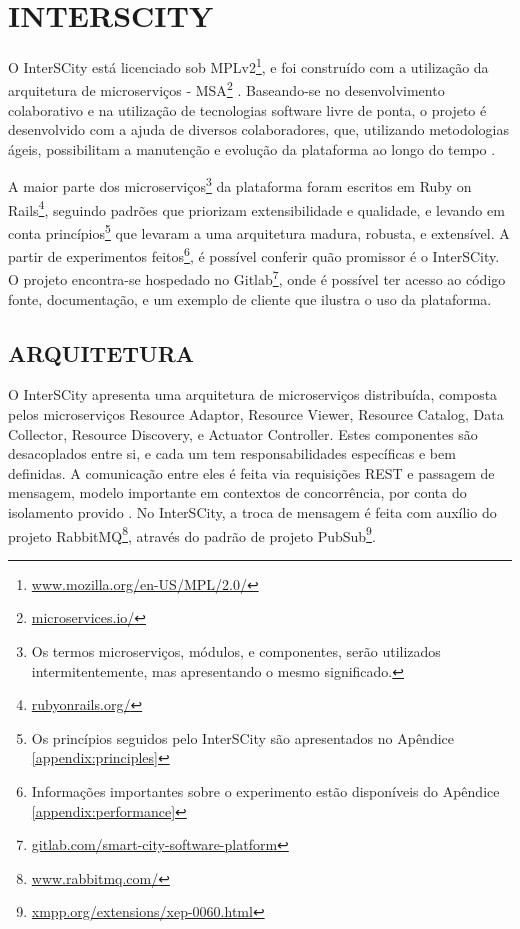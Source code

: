 \chapter[INTERSCITY]{INTERSCITY}
\label{chapter:interscity}

O InterSCity está licenciado sob MPLv2\footnote{\url{www.mozilla.org/en-US/MPL/2.0/}},
e foi construído com a utilização da arquitetura de microserviços -
MSA\footnote{\url{microservices.io/}}
\cite{delesposte2017}. Baseando-se no desenvolvimento colaborativo e na
utilização de tecnologias software livre de ponta, o projeto é desenvolvido
com a ajuda de diversos colaboradores, que, utilizando metodologias ágeis,
possibilitam a manutenção e evolução da plataforma ao longo do tempo \cite{delesposte2017}.

A maior parte dos microserviços\footnote{Os termos microserviços, módulos, e
componentes, serão utilizados intermitentemente, mas apresentando o mesmo
significado.} da plataforma foram escritos em Ruby on Rails\footnote{\url{rubyonrails.org/}},
seguindo padrões que priorizam extensibilidade e qualidade, e levando em conta
princípios\footnote{Os princípios seguidos pelo InterSCity são apresentados no
Apêndice \ref{appendix:principles}} que levaram a uma arquitetura madura,
robusta, e extensível. A partir de experimentos feitos\footnote{Informações
importantes sobre o experimento estão disponíveis do Apêndice \ref{appendix:performance}
}, é possível conferir quão promissor é o InterSCity. O projeto encontra-se
hospedado no Gitlab\footnote{\url{gitlab.com/smart-city-software-platform}},
onde é possível ter acesso ao código fonte, documentação, e um exemplo de
cliente que ilustra o uso da plataforma.

\section{ARQUITETURA}

O InterSCity apresenta uma arquitetura de microserviços distribuída, composta
pelos microserviços Resource Adaptor, Resource Viewer, Resource Catalog,
Data Collector, Resource Discovery, e Actuator Controller. Estes componentes
são desacoplados entre si, e cada um tem responsabilidades específicas e bem
definidas. A comunicação entre eles é feita via requisições REST e passagem de
mensagem, modelo importante em contextos de concorrência, por conta do
isolamento provido \cite{armstrong2003}. No InterSCity, a troca de mensagem
é feita com auxílio do projeto RabbitMQ\footnote{\url{www.rabbitmq.com/}},
através do padrão de projeto
PubSub\footnote{\url{xmpp.org/extensions/xep-0060.html}}.

